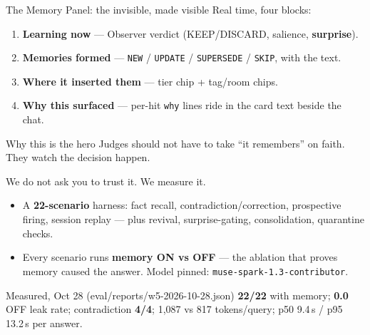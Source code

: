 \documentclass[aspectratio=169,10pt]{beamer}
\begin{document}
\begin{frame}{The Memory Panel: the invisible, made visible}
  Real time, four blocks:
  \begin{enumerate}
    \item \textbf{Learning now} --- Observer verdict (KEEP/DISCARD, salience, \textbf{surprise}).
    \item \textbf{Memories formed} --- \texttt{NEW} / \texttt{UPDATE} / \texttt{SUPERSEDE} / \texttt{SKIP}, with the text.
    \item \textbf{Where it inserted them} --- tier chip + tag/room chips.
    \item \textbf{Why this surfaced} --- per-hit \texttt{why} lines ride in the card text beside the chat.
  \end{enumerate}
  \vfill
  \begin{block}{Why this is the hero}
    Judges should not have to take ``it remembers'' on faith. They watch the decision happen.
  \end{block}
\end{frame}

\begin{frame}{We do not ask you to trust it. We measure it.}
  \begin{itemize}
    \item A \textbf{22-scenario} harness: fact recall, contradiction/correction, prospective
    firing, session replay --- plus revival, surprise-gating, consolidation, quarantine checks.
    \item Every scenario runs \textbf{memory ON vs OFF} --- the ablation that proves memory caused
    the answer. Model pinned: \texttt{muse-spark-1.3-contributor}.
  \end{itemize}
  \vfill
  \begin{alertblock}{Measured, Oct 28 ({\ttfamily eval/reports/w5-2026-10-28.json})}
    \textbf{22/22} with memory; \textbf{0.0} OFF leak rate; contradiction \textbf{4/4};
    1{,}087 vs 817 tokens/query; p50 9.4\,s / p95 13.2\,s per answer.
  \end{alertblock}
\end{frame}
\end{document}
